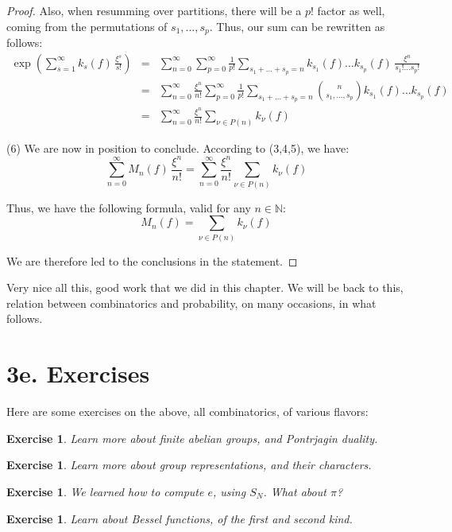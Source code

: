 \documentclass[12pt]{amsbook}
\newtheorem{exercise}[theorem]{Exercise}
\begin{document}
\begin{proof}
Also, when resumming over partitions, there will be a $p!$ factor as well, coming from the permutations of $s_1,\ldots,s_p$. Thus, our sum can be rewritten as follows:
\begin{eqnarray*}
\exp\left(\sum_{s=1}^\infty k_s(f)\,\frac{\xi^s}{s!}\right)
&=&\sum_{n=0}^\infty\sum_{p=0}^\infty\frac{1}{p!}\sum_{s_1+\ldots+s_p=n}k_{s_1}(f)\ldots k_{s_p}(f)\,\frac{\xi^n}{s_1!\ldots s_p!}\\
&=&\sum_{n=0}^\infty\frac{\xi^n}{n!}\sum_{p=0}^\infty\frac{1}{p!}\sum_{s_1+\ldots+s_p=n}\binom{n}{s_1,\ldots,s_p}k_{s_1}(f)\ldots k_{s_p}(f)\\
&=&\sum_{n=0}^\infty\frac{\xi^n}{n!}\sum_{\nu\in P(n)}k_\nu(f)
\end{eqnarray*}

(6) We are now in position to conclude. According to (3,4,5), we have:
$$\sum_{n=0}^\infty M_n(f)\,\frac{\xi^n}{n!}=\sum_{n=0}^\infty\frac{\xi^n}{n!}\sum_{\nu\in P(n)}k_\nu(f)$$

Thus, we have the following formula, valid for any $n\in\mathbb N$:
$$M_n(f)=\sum_{\nu\in P(n)}k_\nu(f)$$

We are therefore led to the conclusions in the statement.
\end{proof}

Very nice all this, good work that we did in this chapter. We will be back to this, relation between combinatorics and probability, on many occasions, in what follows.

\section*{3e. Exercises}

Here are some exercises on the above, all combinatorics, of various flavors:

\begin{exercise}
Learn more about finite abelian groups, and Pontrjagin duality.
\end{exercise}

\begin{exercise}
Learn more about group representations, and their characters.
\end{exercise}

\begin{exercise}
We learned how to compute $e$, using $S_N$. What about $\pi$?
\end{exercise}

\begin{exercise}
Learn about Bessel functions, of the first and second kind.
\end{exercise}
\end{document}
